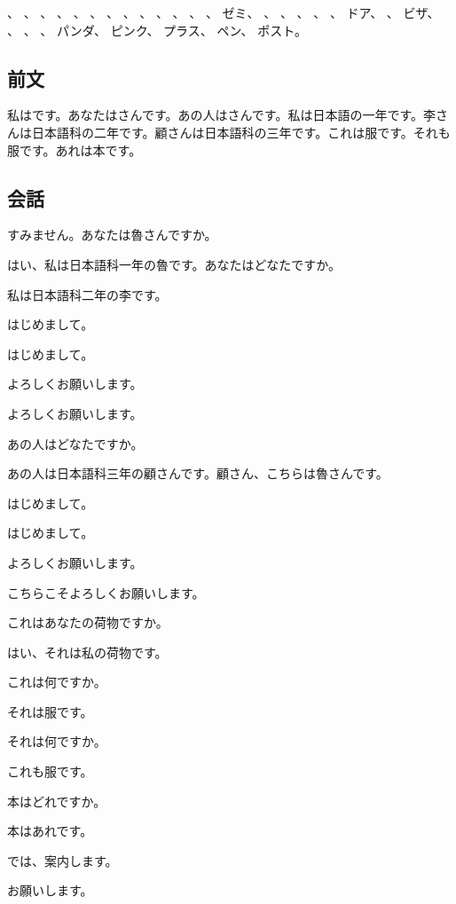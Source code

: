 \documentclass[a5j]{ltjtarticle}
\newcommand*{\RuSpeaks}{\item[魯]}
\newcommand*{\LiSpeaks}{\item[李]}
\newcommand*{\GuSpeaks}{\item[顧]}
\begin{document}
\begin{onehalfspace}
  、
  、
  、
  、
  、
  、
  、
  、
  、
  、
  、
  、
  、
  ゼミ、
  、
  、
  、
  、
  、
  ドア、
  、
  ビザ、
  、
  、
  、
  パンダ、
  ピンク、
  プラス、
  ペン、
  ポスト。
\end{onehalfspace}

\subsection*{前文}

私はです。あなたはさんです。あの人はさんです。私は日本語の一年です。李さんは日本語科の二年です。顧さんは日本語科の三年です。これは服です。それも服です。あれは本です。

\subsection*{会話}

\begin{dialogue}[labelwidth=\zw]
  \LiSpeaks すみません。あなたは魯さんですか。
  \RuSpeaks はい、私は日本語科一年の魯です。あなたはどなたですか。
  \LiSpeaks 私は日本語科二年の李です。
  \RuSpeaks はじめまして。
  \LiSpeaks はじめまして。
  \RuSpeaks よろしくお願いします。
  \LiSpeaks よろしくお願いします。
  \RuSpeaks あの人はどなたですか。
  \LiSpeaks あの人は日本語科三年の顧さんです。顧さん、こちらは魯さんです。
  \GuSpeaks はじめまして。
  \RuSpeaks はじめまして。
  \GuSpeaks よろしくお願いします。
  \RuSpeaks こちらこそよろしくお願いします。
\item[]
  \LiSpeaks これはあなたの荷物ですか。
  \RuSpeaks はい、それは私の荷物です。
  \LiSpeaks これは何ですか。
  \RuSpeaks それは服です。
  \LiSpeaks それは何ですか。
  \RuSpeaks これも服です。
  \LiSpeaks 本はどれですか。
  \RuSpeaks 本はあれです。
  \LiSpeaks では、案内します。
  \RuSpeaks お願いします。
\end{dialogue}
\end{document}
